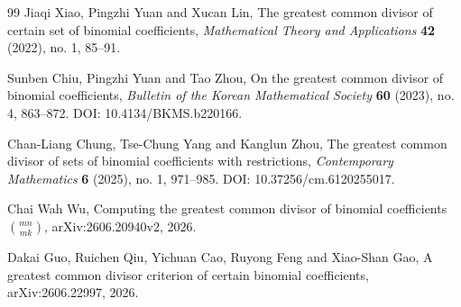 \documentclass[11pt]{article}
\begin{document}
\begin{thebibliography}{99}
Jiaqi Xiao, Pingzhi Yuan and Xucan Lin, The greatest common divisor of certain
set of binomial coefficients, \emph{Mathematical Theory and Applications}
\textbf{42} (2022), no. 1, 85--91.

Sunben Chiu, Pingzhi Yuan and Tao Zhou, On the greatest common divisor of
binomial coefficients, \emph{Bulletin of the Korean Mathematical Society}
\textbf{60} (2023), no. 4, 863--872. DOI: 10.4134/BKMS.b220166.

Chan-Liang Chung, Tse-Chung Yang and Kanglun Zhou, The greatest common divisor
of sets of binomial coefficients with restrictions, \emph{Contemporary
Mathematics} \textbf{6} (2025), no. 1, 971--985. DOI:
10.37256/cm.6120255017.

Chai Wah Wu, Computing the greatest common divisor of binomial coefficients
$\binom{mn}{mk}$, arXiv:2606.20940v2, 2026.

Dakai Guo, Ruichen Qiu, Yichuan Cao, Ruyong Feng and Xiao-Shan Gao, A greatest
common divisor criterion of certain binomial coefficients, arXiv:2606.22997,
2026.

\end{thebibliography}
\end{document}
